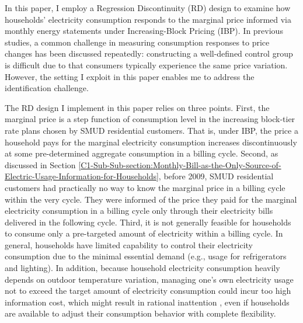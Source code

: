 In this paper, I employ a Regression Discontinuity (RD) design to examine how households' electricity consumption responds to the marginal price informed via monthly energy statements under Increasing-Block Pricing (IBP). In previous studies, a common challenge in measuring consumption responses to price changes has been discussed repeatedly: constructing a well-defined control group is difficult due to that consumers typically experience the same price variation. However, the setting I exploit in this paper enables me to address the identification challenge.  

The RD design I implement in this paper relies on three points. First, the marginal price is a step function of consumption level in the increasing block-tier rate plans chosen by SMUD residential customers. That is, under IBP, the price a household pays for the marginal electricity consumption increases discontinuously at some pre-determined aggregate consumption in a billing cycle. Second, as discussed in Section \ref{C1-Sub-Sub-section:Monthly-Bill-as-the-Only-Source-of-Electric-Usage-Information-for-Households}, before 2009, SMUD residential customers had practically no way to know the marginal price in a billing cycle within the very cycle. They were informed of the price they paid for the marginal electricity consumption in a billing cycle only through their electricity bills delivered in the following cycle. Third, it is not generally feasible for households to consume only a pre-targeted amount of electricity within a billing cycle. In general, households have limited capability to control their electricity consumption due to the minimal essential demand (e.g., usage for refrigerators and lighting). In addition, because household electricity consumption heavily depends on outdoor temperature variation, managing one's own electricity usage not to exceed the target amount of electricity consumption could incur too high information cost, which might result in rational inattention \citep{Rational-Inattention-and-Energy-Efficiency_Sallee_(2014)}, even if households are available to adjust their consumption behavior with complete flexibility. 

